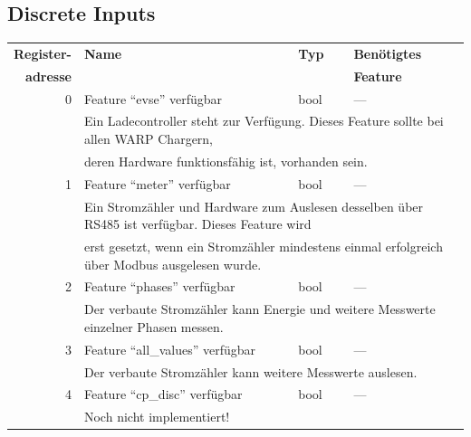 \documentclass[a4paper,10pt]{article}
\newcommand{\tdesc}[1]{\multicolumn{3}{l}{\footnotesize #1}}
\begin{document}
\subsection{Discrete Inputs}
\begin{tabularx}{\textwidth}{rXll} \toprule
    \textbf{Register-} & \textbf{Name} & \textbf{Typ} & \textbf{Benötigtes}                                                     \\
    \textbf{adresse}   &      &     & \textbf{Feature}                                                                          \\ \midrule
0             & Feature \enquote{evse} verfügbar        & bool         & ---                                                    \\
              & \tdesc{Ein Ladecontroller steht zur Verfügung. Dieses Feature sollte bei allen WARP Chargern,}                  \\
              & \tdesc{deren Hardware funktionsfähig ist, vorhanden sein.}                                                      \\ \cmidrule{2-4}
1             & Feature \enquote{meter} verfügbar       & bool         & ---                                                    \\
              & \tdesc{Ein Stromzähler und Hardware zum Auslesen desselben über RS485 ist verfügbar. Dieses Feature wird }      \\
              & \tdesc{erst gesetzt, wenn ein Stromzähler mindestens einmal erfolgreich über Modbus ausgelesen wurde.}          \\ \cmidrule{2-4}
2             & Feature \enquote{phases} verfügbar      & bool         & ---                                                    \\
              & \tdesc{Der verbaute Stromzähler kann Energie und weitere Messwerte einzelner Phasen messen.}                    \\ \cmidrule{2-4}
3             & Feature \enquote{all\_values} verfügbar & bool         & ---                                                    \\
              & \tdesc{Der verbaute Stromzähler kann weitere Messwerte auslesen.}                                               \\ \cmidrule{2-4}
4             & Feature \enquote{cp\_disc} verfügbar    & bool         & ---                                                    \\
              & \tdesc{Noch nicht implementiert!}                                                                               \\ \cmidrule{2-4}

\end{tabularx}
\end{document}
